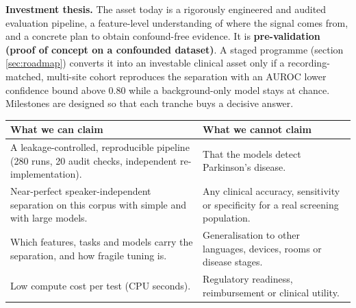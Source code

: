 \documentclass[10pt,a4paper]{article}
\begin{document}
\textbf{Investment thesis.} The asset today is a rigorously engineered and audited evaluation pipeline, a feature-level understanding of where the signal comes from, and a concrete plan to obtain confound-free evidence. It is \textbf{pre-validation (proof of concept on a confounded dataset)}. A staged programme (section \ref{sec:roadmap}) converts it into an investable clinical asset only if a recording-matched, multi-site cohort reproduces the separation with an AUROC lower confidence bound above 0.80 while a background-only model stays at chance. Milestones are designed so that each tranche buys a decisive answer.
\begin{center}\small\begin{tabular}{p{7.4cm}p{7.4cm}}\toprule\textbf{What we can claim} & \textbf{What we cannot claim}\\\midrule A leakage-controlled, reproducible pipeline (280 runs, 20 audit checks, independent re-implementation). & That the models detect Parkinson's disease. \\ Near-perfect speaker-independent separation on this corpus with simple and with large models. & Any clinical accuracy, sensitivity or specificity for a real screening population. \\ Which features, tasks and models carry the separation, and how fragile tuning is. & Generalisation to other languages, devices, rooms or disease stages. \\ Low compute cost per test (CPU seconds). & Regulatory readiness, reimbursement or clinical utility. \\\bottomrule\end{tabular}\end{center}
\end{document}
